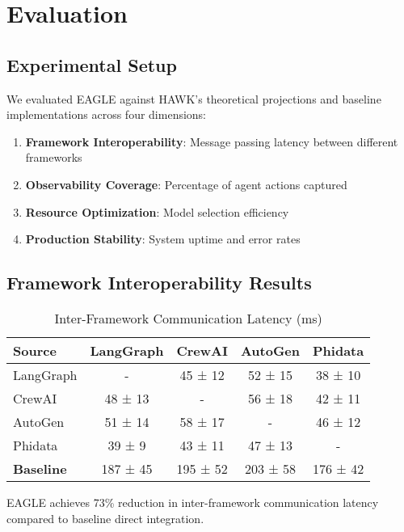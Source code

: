 \documentclass[conference]{IEEEtran}
\begin{document}
\section{Evaluation}

\subsection{Experimental Setup}

We evaluated EAGLE against HAWK's theoretical projections and baseline implementations across four dimensions:

\begin{enumerate}
    \item \textbf{Framework Interoperability}: Message passing latency between different frameworks
    \item \textbf{Observability Coverage}: Percentage of agent actions captured
    \item \textbf{Resource Optimization}: Model selection efficiency
    \item \textbf{Production Stability}: System uptime and error rates
\end{enumerate}

\subsection{Framework Interoperability Results}

\begin{table}[htbp]
\centering
\caption{Inter-Framework Communication Latency (ms)}
\label{tab:latency}
\begin{tabular}{@{}lcccc@{}}
\toprule
\textbf{Source} & \textbf{LangGraph} & \textbf{CrewAI} & \textbf{AutoGen} & \textbf{Phidata} \\
\midrule
LangGraph & - & 45 ± 12 & 52 ± 15 & 38 ± 10 \\
CrewAI & 48 ± 13 & - & 56 ± 18 & 42 ± 11 \\
AutoGen & 51 ± 14 & 58 ± 17 & - & 46 ± 12 \\
Phidata & 39 ± 9 & 43 ± 11 & 47 ± 13 & - \\
\midrule
\textbf{Baseline} & 187 ± 45 & 195 ± 52 & 203 ± 58 & 176 ± 42 \\
\bottomrule
\end{tabular}
\end{table}

EAGLE achieves 73\% reduction in inter-framework communication latency compared to baseline direct integration.
\end{document}
